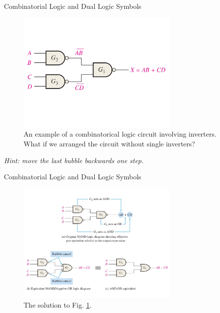 \documentclass{beamer}
\begin{document}
\begin{frame}{Combinatorial Logic and Dual Logic Symbols}
\begin{figure}
\centering
\includegraphics[width=0.7\textwidth,trim=0cm 4cm 0cm 4cm,clip=true]{figures/ch5_1.pdf}
\caption{\label{fig:ch5_1} An example of a combinatorical logic circuit involving inverters.  What if we arranged the circuit without single inverters?}
\end{figure}
\textit{Hint: move the last bubble backwards one step.}
\end{frame}

\begin{frame}{Combinatorial Logic and Dual Logic Symbols}
\begin{figure}
\centering
\includegraphics[width=0.7\textwidth,trim=0cm 2cm 0cm 1cm,clip=true]{figures/ch5_2.pdf}
\caption{\label{fig:ch5_2} The solution to Fig. \ref{fig:ch5_1}.}
\end{figure}
\end{frame}
\end{document}

